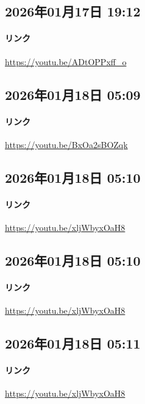 \subsection*{2026年01月17日 19:12}

\paragraph{リンク}
\url{https://youtu.be/ADtOPPxff_o}

\subsection*{2026年01月18日 05:09}

\paragraph{リンク}
\url{https://youtu.be/BxOa2sBOZqk}

\subsection*{2026年01月18日 05:10}

\paragraph{リンク}
\url{https://youtu.be/xljWbyxOaH8}

\subsection*{2026年01月18日 05:10}

\paragraph{リンク}
\url{https://youtu.be/xljWbyxOaH8}

\subsection*{2026年01月18日 05:11}

\paragraph{リンク}
\url{https://youtu.be/xljWbyxOaH8}

